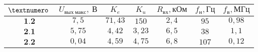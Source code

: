 \begin{tabular}{| c | c | c | c | c | c | c |}
\hline
$№ \text{\:}$ & $U_{вых \: макс}, \: В$ & $K_e$ & $K_u$ & $R_{вх}, кОм$ & $f_н, Гц$ & $f_в, МГц$\\
\hline
$\textbf{1.2}$ & $7,5$ & $71,43$ & $150$ & $2,4$ & $95$ & $0,98$\\
\hline
$\textbf{2.1}$ & $5,75$ & $4,42$ & $3,23$ & $6,5$ & $38$ & $1,1$\\
\hline
$\textbf{2.2}$ & $0,04$ & $4,59$ & $4,75$ & $6,8$ & $107$ & $0,12$\\
\hline
\end{tabular}
